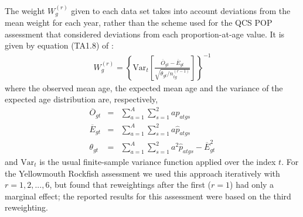 \documentclass[11pt]{article}   %
\def\headc{\vspace{-1ex}} %
\def\subsub#1{\noindent {\bf #1} \headc}    %
\newcommand{\popQCS}{Edwards-etal:2012pop}
\newcommand{\ymr}{Edwards-etal:2012ymr}
\def\Var{\mbox{Var}}             \def\Cov{\mbox{Cov}}
\newcommand{\eb}{\begin{eqnarray}}
\newcommand{\ee}{\end{eqnarray}}
\begin{document}
The \citet{fran11} weight $W_{g}^{(r)}$ given to each data set takes into account deviations from the mean weight for each year, rather than the scheme used for the QCS POP assessment \citep{\popQCS} that considered deviations from each proportion-at-age value. It is given by equation (TA1.8) of \citet{fran11}:
\eb
W_{g}^{(r)} = \left\{ \Var_t \left[ \frac{\overline{O}_{gt} - \overline{E}_{gt}}{\sqrt{ \theta_{gt} / n_{tg}^{(r-1)}}} \right] \right\}^{-1}
\ee
where the observed mean age, the expected mean age and the variance of the expected age distribution are, respectively,
\eb
\overline{O}_{gt} & = & \sum_{a=1}^{A} \sum_{s=1}^2 a p_{atgs}\\
\overline{E}_{gt} & = & \sum_{a=1}^{A} \sum_{s=1}^2 a \widehat{p}_{atgs}\\
\theta_{gt} & = & \sum_{a=1}^{A} \sum_{s=1}^2 a^2 \widehat{p}_{atgs} - \overline{E}_{gt}^2
\ee
and $\Var_t$ is the usual finite-sample variance function applied over the index $t$. For the Yellowmouth Rockfish assessment \citet{\ymr} we used this approach iteratively with $r=1,2,...,6$, but found that reweightings after the first ($r=1$) had only a marginal effect; the reported results for this assessment were based on the third reweighting.



\end{document}
